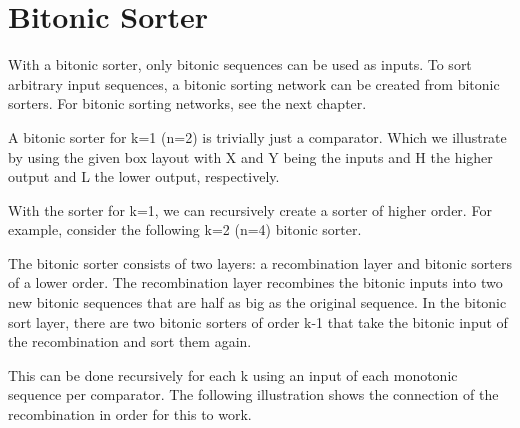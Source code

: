 \documentclass{article}
\newcommand{\compareBlock}[2][]{
    \pgfkeys{/compareBlock, default, #1}%
    \coordinate (\cbName_a) at ($(0, 1.33) + #2$);
    \coordinate (\cbName_b) at ($(0, 0.66) + #2$);
    \coordinate (\cbName_l) at ($(1.5, 0.66) + #2$);
    \coordinate (\cbName_h) at ($(1.5, 1.33) + #2$);

    \draw[color=\cbCA] (\cbName_a) -- ++(0.2, 0)node[anchor=west]{\cbA};
    \draw[color=\cbCB] (\cbName_b) -- ++(0.2, 0)node[anchor=west]{\cbB};
    \draw[color=\cbCL] (\cbName_l) -- ++(-0.2, 0)node[anchor=east]{\cbL};
    \draw[color=\cbCH] (\cbName_h) -- ++(-0.2, 0)node[anchor=east]{\cbH};
    \draw[draw=black] #2 rectangle ++(1.5,2);
}
\newcommand{\connectCB}[3]{
    \draw[color=#3] (#1) -- (#2);
}
\newcommand{\inputCB}[3]{
    \coordinate (#2) at ($(#1_a) - (0.75, 0)$);
    \coordinate (#3) at ($(#1_b) - (0.75, 0)$);
    \node at (#2) [anchor=east]{#2};
    \node at (#3) [anchor=east]{#3};
}
\newcommand{\outputCB}[3]{
    \coordinate (#2) at ($(#1_h) + (0.25, 0)$);
    \coordinate (#3) at ($(#1_l) + (0.25, 0)$);
    \node at (#2) [anchor=west]{#2};
    \node at (#3) [anchor=west]{#3};
    \connectCB{#2}{#1_h}{black}
    \connectCB{#3}{#1_l}{black}
}
\begin{document}
\section{Bitonic Sorter}

With a bitonic sorter, only bitonic sequences can be used as inputs.
To sort arbitrary input sequences, a bitonic sorting network can be created from bitonic sorters.
For bitonic sorting networks, see the next chapter.

A bitonic sorter for k=1 (n=2) is trivially just a comparator. 
Which we illustrate by using the given box layout with X and Y being the inputs and H the higher output and L the lower output, respectively.


With the sorter for k=1, we can recursively create a sorter of higher order.
For example, consider the following k=2 (n=4) bitonic sorter.


The bitonic sorter consists of two layers: a recombination layer and bitonic sorters of a lower order.
The recombination layer recombines the bitonic inputs into two new bitonic sequences that are half as big as the original sequence.
In the bitonic sort layer, there are two bitonic sorters of order k-1 that take the bitonic input of the recombination and sort them again.

This can be done recursively for each k using an input of each monotonic sequence per comparator.
The following illustration shows the connection of the recombination in order for this to work.
\end{document}
